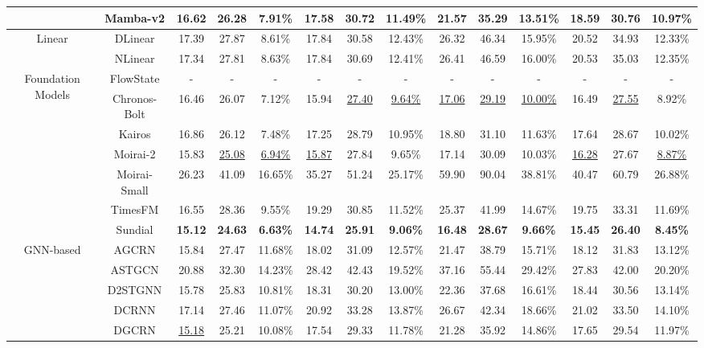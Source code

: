 \begin{table}[t]
{\begin{tabular}{c|c|c|c|c|c|c|c|c|c|c|c|c|c}
 & Mamba-v2 & 16.62 & 26.28 & 7.91\% & 17.58 & 30.72 & 11.49\% & 21.57 & 35.29 & 13.51\% & 18.59 & 30.76 & 10.97\% \\
\midrule
\multirow{2}{*}{Linear} & DLinear & 17.39 & 27.87 & 8.61\% & 17.84 & 30.58 & 12.43\% & 26.32 & 46.34 & 15.95\% & 20.52 & 34.93 & 12.33\% \\
 & NLinear & 17.34 & 27.81 & 8.63\% & 17.84 & 30.69 & 12.41\% & 26.41 & 46.59 & 16.00\% & 20.53 & 35.03 & 12.35\% \\
\midrule
\multirow{7}{*}{Foundation Models} & FlowState & - & - & - & - & - & - & - & - & - & - & - & - \\
 & Chronos-Bolt & 16.46 & 26.07 & 7.12\% & 15.94 & \underline{27.40} & \underline{9.64\%} & \underline{17.06} & \underline{29.19} & \underline{10.00\%} & 16.49 & \underline{27.55} & 8.92\% \\
 & Kairos & 16.86 & 26.12 & 7.48\% & 17.25 & 28.79 & 10.95\% & 18.80 & 31.10 & 11.63\% & 17.64 & 28.67 & 10.02\% \\
 & Moirai-2 & 15.83 & \underline{25.08} & \underline{6.94\%} & \underline{15.87} & 27.84 & 9.65\% & 17.14 & 30.09 & 10.03\% & \underline{16.28} & 27.67 & \underline{8.87\%} \\
 & Moirai-Small & 26.23 & 41.09 & 16.65\% & 35.27 & 51.24 & 25.17\% & 59.90 & 90.04 & 38.81\% & 40.47 & 60.79 & 26.88\% \\
 & TimesFM & 16.55 & 28.36 & 9.55\% & 19.29 & 30.85 & 11.52\% & 25.37 & 41.99 & 14.67\% & 19.75 & 33.31 & 11.69\% \\
 & Sundial & \textbf{15.12} & \textbf{24.63} & \textbf{6.63\%} & \textbf{14.74} & \textbf{25.91} & \textbf{9.06\%} & \textbf{16.48} & \textbf{28.67} & \textbf{9.66\%} & \textbf{15.45} & \textbf{26.40} & \textbf{8.45\%} \\
\midrule
\multirow{10}{*}{GNN-based} & AGCRN & 15.84 & 27.47 & 11.68\% & 18.02 & 31.09 & 12.57\% & 21.47 & 38.79 & 15.71\% & 18.12 & 31.83 & 13.12\% \\
 & ASTGCN & 20.88 & 32.30 & 14.23\% & 28.42 & 42.43 & 19.52\% & 37.16 & 55.44 & 29.42\% & 27.83 & 42.00 & 20.20\% \\
 & D2STGNN & 15.78 & 25.83 & 10.81\% & 18.31 & 30.20 & 13.00\% & 22.36 & 37.68 & 16.61\% & 18.44 & 30.56 & 13.14\% \\
 & DCRNN & 17.14 & 27.46 & 11.07\% & 20.92 & 33.28 & 13.87\% & 26.67 & 42.34 & 18.66\% & 21.02 & 33.50 & 14.10\% \\
 & DGCRN & \underline{15.18} & 25.21 & 10.08\% & 17.54 & 29.33 & 11.78\% & 21.28 & 35.92 & 14.86\% & 17.65 & 29.54 & 11.97\% \\

\end{tabular}}
\end{table}
